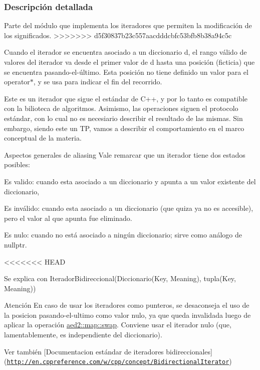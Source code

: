 \subsubsection{Descripción detallada}
Parte del módulo que implementa los iteradores que permiten la modificación de los significados. 
>>>>>>> d5f30837b23c557aacdddcbfc53bfb8b38a94c5c

Cuando el iterador se encuentra asociado a un diccionario {\ttfamily d}, el rango válido de valores del iterador va desde el primer valor de {\ttfamily d} hasta una posición (ficticia) que se encuentra pasando-\/el-\/último. Esta posición no tiene definido un valor para el {\ttfamily operator$\ast$}, y se usa para indicar el fin del recorrido.

Este es un iterador que sigue el estándar de C++, y por lo tanto es compatible con la bilioteca de algoritmos. Asimismo, las operaciones siguen el protocolo estándar, con lo cual no es necesiario describir el resultado de las mismas. Sin embargo, siendo este un TP, vamos a describir el comportamiento en el marco conceptual de la materia.

\begin{DoxyParagraph}{Aspectos generales de aliasing}
Vale remarcar que un iterador tiene dos estados posibles\+:
\begin{DoxyEnumerate}
\item Es valido\+: cuando esta asociado a un diccionario y apunta a un valor existente del diccionario,
\item Es inválido\+: cuando esta asociado a un diccionario (que quiza ya no es accesible), pero el valor al que apunta fue eliminado.
\item Es nulo\+: cuando no está asociado a ningún diccionario; sirve como análogo de {\ttfamily nullptr}. 
\end{DoxyEnumerate}
\end{DoxyParagraph}
<<<<<<< HEAD
\begin{DoxyParagraph}{\-Se explica con}
\-Iterador\-Bidireccional(\-Diccionario(\-Key, \-Meaning), tupla(\-Key, \-Meaning))
\end{DoxyParagraph}
\begin{DoxyAttention}{\-Atención}
\-En caso de usar los iteradores como punteros, se desaconseja el uso de la posicion pasando-\/el-\/ultimo como valor nulo, ya que queda invalidada luego de aplicar la operación \hyperlink{classaed2_1_1map_a43ddb71cc91e5c6021a7a1f243d6cc4a_a43ddb71cc91e5c6021a7a1f243d6cc4a}{aed2\-::map\-::swap}. \-Conviene usar el iterador nulo (que, lamentablemente, es independiente del diccionario).
\end{DoxyAttention}
\begin{DoxySeeAlso}{\-Ver también}
\mbox{[}\-Documentacion estándar de iteradores bidireccionales\mbox{]}(\href{http://en.cppreference.com/w/cpp/concept/BidirectionalIterator}{\tt http\-://en.\-cppreference.\-com/w/cpp/concept/\-Bidirectional\-Iterator}) 
\end{DoxySeeAlso}


